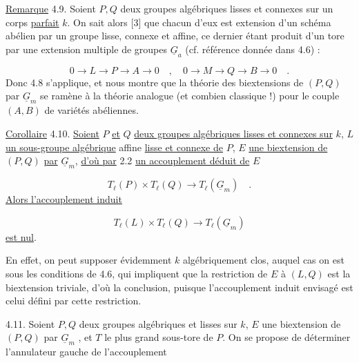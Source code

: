 
\underline{Remarque} 4.9. Soient $P,Q$ deux groupes algébriques lisses et connexes sur un corps \underline{parfait} $k$. On sait alors [3] que chacun d'eux est extension d'un schéma abélien par un groupe lisse, connexe et affine, ce dernier étant produit d'un tore par une extension multiple de groupes $\underline{G}_a$ (cf. référence donnée dans 4.6) :

\begin{equation*}
0 \longrightarrow L \longrightarrow P \longrightarrow A \longrightarrow 0 \quad , \quad 0 \longrightarrow M \longrightarrow Q \longrightarrow B \longrightarrow 0 \quad .
\end{equation*}
Donc 4.8 s'applique, et nous montre que la théorie des biextensions de $(P,Q)$ par $\underline{G}_m$ se ramène à la théorie analogue (et combien classique !) pour le couple $(A,B)$ de variétés abéliennes.

\underline{Corollaire} 4.10. \underline{Soient} $P$ \underline{et} $Q$ \underline{deux groupes algébriques lisses et connexes sur} $k$, $L$ \underline{un sous-groupe algébrique} affine \underline{lisse et connexe de} $P$, $E$ \underline{une biextension de} $(P,Q)$ \underline{par} $\underline{G}_m$, \underline{d'où par} 2.2 \underline{un accouplement déduit de} $E$

\begin{equation*}
T_\ell(P) \times T_\ell(Q) \longrightarrow T_\ell(\underline{G}_m) \quad .
\end{equation*}
\underline{Alors l'accouplement induit}

\begin{equation*}
T_\ell(L) \times T_\ell(Q) \longrightarrow T_\ell(\underline{G}_m)
\end{equation*}
\underline{est nul}.

En effet, on peut supposer évidemment $k$ algébriquement clos, auquel cas on est sous les conditions de 4.6, qui impliquent que la restriction de $E$ à $(L,Q)$ est la biextension triviale, d'où la conclusion, puisque l'accouplement induit envisagé est celui défini par cette restriction.



4.11.  Soient $P,Q$ deux groupes algébriques et lisses sur $k$, $E$ une biextension de $(P,Q)$ par $\underline{G}_m$ , et $T$ le plus grand sous-tore de $P$. On se propose de déterminer l'annulateur gauche de l'accouplement

